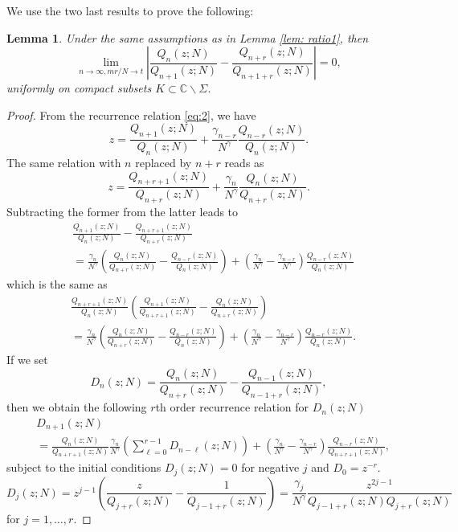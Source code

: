 \documentclass[12pt]{article}
\newtheorem{lemma}[theorem]{Lemma}
\numberwithin{equation}{section}
\begin{document}
We use the two last results to prove the following: 
\begin{lemma}\label{lemma independence of limits} Under the same assumptions as in Lemma \ref{lem: ratio1}, then  
\[ 
	\lim_{n\to \infty, mr/N \to t}\left| \frac{Q_{n}(z;N)}{Q_{n+1}(z;N)} - \frac{Q_{n+r}(z;N)}{Q_{n+1+r}(z;N)} \right| = 0, 
\] 
uniformly on compact subsets $K\subset \mathbb{C} \backslash \Sigma$.
\end{lemma}
\begin{proof}%
From the recurrence relation \eqref{eq:2}, we have 
\[
	z = \frac{Q_{n+1}(z;N)}{Q_{n}(z;N)} 
		+ \frac{\gamma_{n-r}}{N^\gamma} \frac{Q_{n-r}(z;N)}{Q_{n}(z;N)} . 
\]
The same relation with $n$ replaced by $n+r$ reads as 
\[
	z = \frac{Q_{n+r+1}(z;N)}{Q_{n+r}(z;N)} 
		+ \frac{\gamma_{n}}{N^\gamma} \frac{Q_{n}(z;N)}{Q_{n+r}(z;N)} . 
\]
Subtracting the former from the latter leads to
\begin{align*}
&	 \frac{Q_{n+1}(z;N)}{Q_{n}(z;N)}  - \frac{Q_{n+r+1}(z;N)}{Q_{n+r}(z;N)} \\
&	 =  \frac{\gamma_{n}}{N^\gamma} \left(  \frac{Q_{n}(z;N)}{Q_{n+r}(z;N)} - \frac{Q_{n-r}(z;N)}{Q_{n}(z;N)}\right) 
	 + \left(   \frac{\gamma_{n}}{N^\gamma} - \frac{\gamma_{n-r}}{N^\gamma}  \right) \frac{Q_{n-r}(z;N)}{Q_{n}(z;N)}
\end{align*}
which is the same as 
\begin{align*}
	& \frac{Q_{n+r+1}(z;N)}{Q_{n}(z;N)} \left( \frac{Q_{n+1}(z;N)}{Q_{n+r+1}(z;N)}  -   \frac{Q_{n}(z;N)}{Q_{n+r}(z;N)}  \right) \\
	 &  = \frac{\gamma_{n}}{N^\gamma} \left(  \frac{Q_{n}(z;N)}{Q_{n+r}(z;N)} - \frac{Q_{n-r}(z;N)}{Q_{n}(z;N)}\right) 
	 + \left(   \frac{\gamma_{n}}{N^\gamma} - \frac{\gamma_{n-r}}{N^\gamma}  \right) \frac{Q_{n-r}(z;N)}{Q_{n}(z;N)}. 
\end{align*}
If we set 
\[
	D_{n}(z;N) = \frac{Q_{n}(z;N)}{Q_{n+r}(z;N)}  -   \frac{Q_{n-1}(z;N)}{Q_{n-1+r}(z;N)} , 
\]
then we obtain the following $r$th order recurrence relation for $D_n(z;N)$
\begin{align*}
	&D_{n+1} (z;N)\\
	 &  =   \frac{Q_{n}(z;N)}{Q_{n+r+1}(z;N)}\frac{\gamma_{n}}{N^\gamma} \left(  \sum_{\ell = 0}^{r-1} D_{n-\ell} (z;N) \right) 
	 + \left(   \frac{\gamma_{n}}{N^\gamma} - \frac{\gamma_{n-r}}{N^\gamma}  \right) \frac{Q_{n-r}(z;N)}{Q_{n+r+1}(z;N)}, 
\end{align*}
subject to the initial conditions $D_j(z;N)=0$ for negative $j$ and $D_0=z^{-r}$.
\[ D_j(z;N) = z^{j-1}  \left( \frac{z}{Q_{j+r}(z;N)}  -   \frac{1}{Q_{j-1+r}(z;N)}\right) = \frac{\gamma_j }{N^\gamma }\frac{z^{2j-1}}{Q_{j-1+r}(z;N)Q_{j+r}(z;N)}  \]
 for $j=1,\ldots , r$. 


\end{proof}
\end{document}
